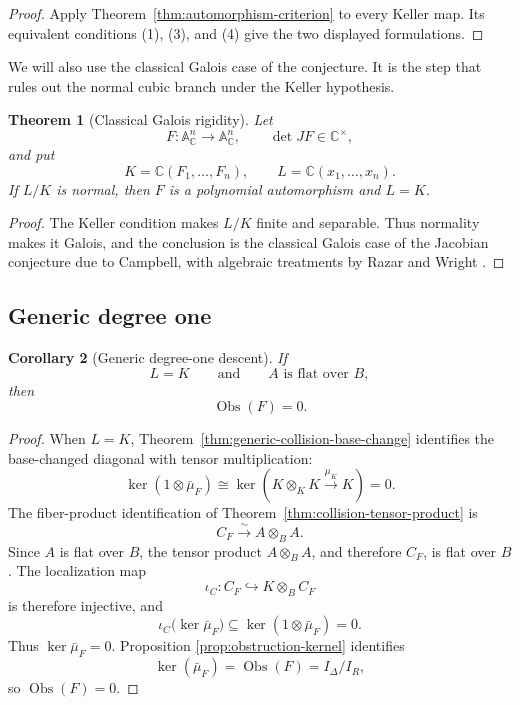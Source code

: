 \documentclass[11pt]{article}
\newtheorem{theorem}{Theorem}[section]
\newtheorem{corollary}[theorem]{Corollary}
\theoremstyle{remark}
\theoremstyle{definition}
\newcommand{\A}{\mathbb A}
\newcommand{\C}{\mathbb C}
\newcommand{\Obs}{\operatorname{Obs}}
\begin{document}
\begin{proof}
Apply Theorem~\ref{thm:automorphism-criterion} to every Keller map.
Its equivalent conditions \textup{(1)}, \textup{(3)}, and \textup{(4)}
give the two displayed formulations.
\end{proof}

We will also use the classical Galois case of the conjecture.  It is the
step that rules out the normal cubic branch under the Keller hypothesis.

\begin{theorem}[Classical Galois rigidity]
\label{thm:classical-galois-rigidity}
Let
\[
  F\colon\A^n_{\C}\longrightarrow\A^n_{\C},
  \qquad \det JF\in\C^\times,
\]
and put
\[
  K=\C(F_1,\dots,F_n),
  \qquad
  L=\C(x_1,\dots,x_n).
\]
If \(L/K\) is normal, then \(F\) is a polynomial automorphism and
\(L=K\).
\end{theorem}

\begin{proof}
The Keller condition makes \(L/K\) finite and separable.  Thus normality
makes it Galois, and the conclusion is the classical Galois case of the
Jacobian conjecture due to Campbell, with algebraic treatments by Razar
and Wright \cite{Campbell1973,Razar1979,Wright1981}.
\end{proof}

\subsection{Generic degree one}

\begin{corollary}[Generic degree-one descent]
\label{cor:generic-degree-one-descent}
If
\[
  L=K
  \qquad\text{and}\qquad
  A\text{ is flat over }B,
\]
then
\[
  \Obs(F)=0.
\]
\end{corollary}

\begin{proof}
When \(L=K\), Theorem~\ref{thm:generic-collision-base-change}
identifies the base-changed diagonal with tensor multiplication:
\[
  \ker(1\otimes\bar\mu_F)
  \cong
  \ker\!\left(
    K\otimes_KK\xrightarrow{\mu_K}K
  \right)
  =
  0.
\]
The fiber-product identification of
Theorem~\ref{thm:collision-tensor-product} is
\[
  C_F\xrightarrow{\sim}A\otimes_BA.
\]
Since \(A\) is flat over \(B\), the tensor product \(A\otimes_BA\), and
therefore \(C_F\), is flat over \(B\).  The localization map
\[
  \iota_C\colon C_F\hookrightarrow K\otimes_BC_F
\]
is therefore injective, and
\[
  \iota_C\bigl(\ker\bar\mu_F\bigr)
  \subseteq
  \ker(1\otimes\bar\mu_F)
  =
  0.
\]
Thus \(\ker\bar\mu_F=0\).  Proposition
\ref{prop:obstruction-kernel} identifies
\[
  \ker(\bar\mu_F)=\Obs(F)=I_\Delta/I_R,
\]
so \(\Obs(F)=0\).
\end{proof}
\end{document}
